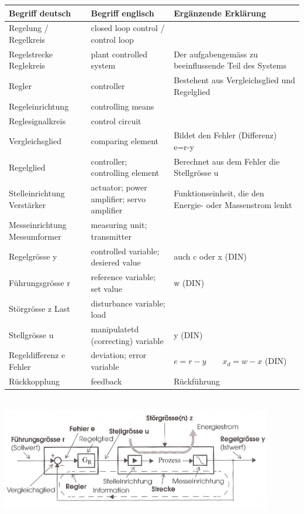 	\begin{tabular}{|p{2.7cm}|p{5.4cm}|l|}
    	\hline
    	{\bf Begriff deutsch}		&{\bf Begriff englisch}	&{\bf Ergänzende
    	Erklärung}\\
		\hline
		Regelung /
		Regelkreis			& closed loop control / control loop & \\
		\hline
		Regelstrecke
    	Reglekreis			&plant controlled system	&Der aufgabengemäss zu beeinflussende
    	Teil des Systems\\
    	\hline
    	Regler				&controller			&Bestehent aus Vergleichsglied und Regelglied\\
    	\hline
    	Regeleinrichtung	&controlling means&\\
    	\hline
    	Reglesignalkreis	&control circuit&\\
    	\hline
    	Vergleichsglied		&comparing element	&Bildet den Fehler (Differenz)
    											e=r-y\\
    	\hline
    	Regelglied			&controller;
    						controlling element	&Berechnet aus dem Fehler die Stellgrösse u\\
    	\hline
    	Stelleinrichtung
    	Verstärker			&actuator;
					    	power amplifier;
    						servo amplifier		&Funktionseinheit, die den Energie- oder Massenstrom
    											lenkt\\
    	\hline
    	Messeinrichtung
    	Messumformer		&measuring unit;
    						transmitter&\\
    	\hline
    	Regelgrösse y		&controlled variable;
    						desiered value& auch c oder x (DIN)\\
    	\hline
    	Führungsgrösse r	&reference variable;
    						set value& w (DIN)\\
    	\hline
    	Störgrösse z Last	&disturbance variable;
    						load&\\
    	\hline
    	Stellgrösse u		&manipulatetd (correcting)
    						variable& y (DIN)\\
    	\hline
    	Regeldifferenz e
    	Fehler				&deviation;
    						error variable		&$e=r-y \quad \quad x_d=w-x$ (DIN) \\
    	\hline
    	Rückkopplung		&feedback			&Rückführung\\
    	\hline

	\end{tabular}\\
\includegraphics[height=4.5cm]{./bilder/Grundregelkreis_klein.jpg}


